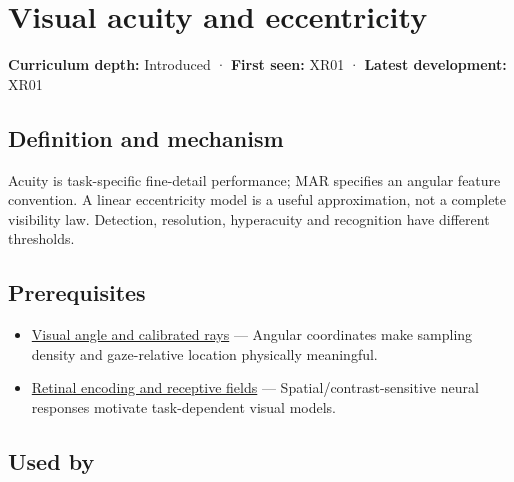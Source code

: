 \hypertarget{appendix-b491fc48c54b}{}\label{referencestart:appendix-b491fc48c54b}
\section{Visual acuity and eccentricity}\label{appendix-b491fc48c54b-visual-acuity-and-eccentricity}

\hypertarget{appendix-b491fc48c54b-visual-acuity-and-eccentricity}{}

\textbf{Curriculum depth:} Introduced · \textbf{First seen:} XR01 · \textbf{Latest development:} XR01

\begin{allmightroledefinition}

\subsection{Definition and mechanism}\label{appendix-b491fc48c54b-definition-and-mechanism}

\hypertarget{appendix-b491fc48c54b-definition-and-mechanism}{}

Acuity is task-specific fine-detail performance; MAR specifies an angular feature convention. A linear eccentricity model is a useful approximation, not a complete visibility law. Detection, resolution, hyperacuity and recognition have different thresholds.

\end{allmightroledefinition}

\subsection{Prerequisites}\label{appendix-b491fc48c54b-prerequisites}

\hypertarget{appendix-b491fc48c54b-prerequisites}{}

\begin{itemize}
\tightlist
\item
  \hyperref[appendix-7d356c396d1a]{Visual angle and calibrated rays} --- Angular coordinates make sampling density and gaze-relative location physically meaningful.
\item
  \hyperref[appendix-7281c15ac44a]{Retinal encoding and receptive fields} --- Spatial/contrast-sensitive neural responses motivate task-dependent visual models.
\end{itemize}

\subsection{Used by}\label{appendix-b491fc48c54b-used-by}

